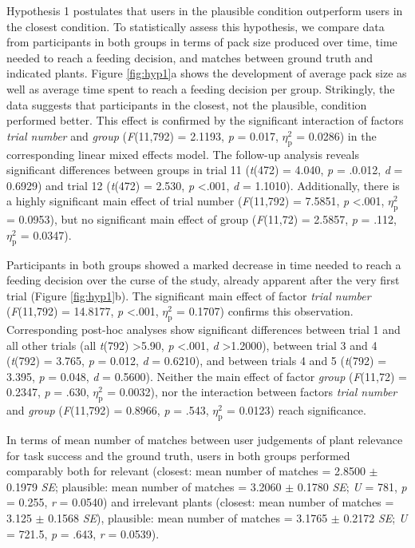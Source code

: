 Hypothesis 1 postulates that users in the plausible condition outperform users in the closest condition.
To statistically assess this hypothesis, we compare data from participants in both groups in terms of pack size produced over time, time needed to reach a feeding decision, and matches between ground truth and indicated plants.
Figure \ref{fig:hyp1}a shows the development of average pack size as well as average time spent to reach a feeding decision per group. 
Strikingly, the data suggests that participants in the closest, not the plausible, condition performed better. 
This effect is confirmed by the significant interaction of factors \textit{trial number} and \textit{group} (\textit{F}(11,792) = 2.1193, \textit{p} = 0.017, $\eta_{\text{p}}^{2}$ = 0.0286) in the corresponding linear mixed effects model. The follow-up analysis reveals significant differences between groups in trial 11 (\textit{t}(472) = 4.040, \textit{p} = .0.012, \textit{d} = 0.6929) and trial 12 (\textit{t}(472) = 2.530, \textit{p} \textless .001, \textit{d} = 1.1010).
Additionally, there is a highly significant main effect of trial number (\textit{F}(11,792) = 7.5851, \textit{p} \textless .001, $\eta_{\text{p}}^{2}$ = 0.0953), but no significant main effect of group (\textit{F}(11,72) = 2.5857, \textit{p} = .112, $\eta_{\text{p}}^{2}$ = 0.0347).

Participants in both groups showed a marked decrease in time needed to reach a feeding decision over the curse of the study, already apparent after the very first trial (Figure \ref{fig:hyp1}b).
The significant main effect of factor \textit{trial number} (\textit{F}(11,792) = 14.8177, \textit{p} \textless .001, $\eta_{\text{p}}^{2}$ = 0.1707) confirms this observation.
Corresponding post-hoc analyses show significant differences between trial 1 and all other trials (all \textit{t}(792) \textgreater 5.90, \textit{p} \textless .001, \textit{d} \textgreater 1.2000), between trial 3 and 4 (\textit{t}(792) = 3.765, \textit{p} = 0.012, \textit{d} = 0.6210), and between trials 4 and 5 (\textit{t}(792) = 3.395, \textit{p} = 0.048, \textit{d} = 0.5600).
Neither the main effect of factor \textit{group} (\textit{F}(11,72) = 0.2347, \textit{p} = .630, $\eta_{\text{p}}^{2}$ = 0.0032), nor the interaction between factors \textit{trial number} and \textit{group} (\textit{F}(11,792) = 0.8966, \textit{p} = .543, $\eta_{\text{p}}^{2}$ = 0.0123) reach significance.

In terms of mean number of matches between user judgements of plant relevance for task success and the ground truth, users in both groups performed comparably both for relevant 
(closest: mean number of matches = 2.8500 $\pm$ 0.1979 \textit{SE}; plausible: mean number of matches = 3.2060 $\pm$ 0.1780 \textit{SE}; \textit{U} = 781, \textit{p} = 0.255, \textit{r} = 0.0540)
and irrelevant plants (closest: mean number of matches = 3.125 $\pm$ 0.1568 \textit{SE}), plausible: mean number of matches = 3.1765 $\pm$ 0.2172 \textit{SE}; \textit{U} = 721.5, \textit{p} = .643, \textit{r} = 0.0539).

